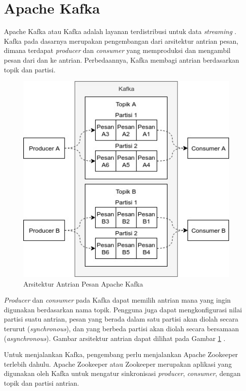 \section{Apache Kafka}
\par Apache Kafka atau Kafka adalah layanan terdistribusi untuk data \textit{streaming} \cite{kafka-online}. Kafka pada dasarnya merupakan pengembangan dari arsitektur antrian pesan, dimana terdapat \textit{producer} dan \textit{consumer} yang memproduksi dan mengambil pesan dari dan ke antrian. Perbedaannya, Kafka membagi antrian berdasarkan topik dan partisi.
\begin{figure}[H]
	\centering\includegraphics[width=1\textwidth]{bab2/img/arsitektur-mq_kafka.jpg}
	\caption{Arsitektur Antrian Pesan Apache Kafka}
	\label{img:arsitektur-mq_kafka}
\end{figure}
\par \textit{Producer} dan \textit{consumer} pada Kafka dapat memilih antrian mana yang ingin digunakan berdasarkan nama topik. Pengguna juga dapat mengkonfigurasi nilai partisi suatu antrian, pesan yang berada dalam satu partisi akan diolah secara terurut (\textit{synchronous}), dan yang berbeda partisi akan diolah secara bersamaan (\textit{asynchronous}). Gambar arsitektur antrian dapat dilihat pada Gambar \ref{img:arsitektur-mq_kafka} \cite{kafka-online}.
\par Untuk menjalankan Kafka, pengembang perlu menjalankan Apache Zookeeper terlebih dahulu. Apache Zookeeper atau Zookeeper merupakan aplikasi yang digunakan oleh Kafka untuk mengatur sinkronisasi \textit{producer}, \textit{consumer}, dengan topik dan partisi antrian.
